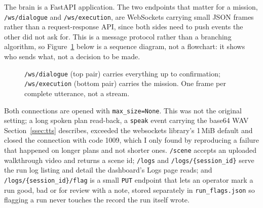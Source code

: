 \label{sec:protocol}

The brain is a FastAPI application. The two endpoints that matter for a
mission, \texttt{/ws/dialogue} and \texttt{/ws/execution}, are WebSockets
carrying small JSON frames rather than a request-response API, since both
sides need to push events the other did not ask for. This is a message
protocol rather than a branching algorithm, so Figure~\ref{fig:protocol}
below is a sequence diagram, not a flowchart: it shows who sends what, not a
decision to be made.

\begin{figure}[htbp]
  \centering
  \caption{\texttt{/ws/dialogue} (top pair) carries everything up to confirmation; \texttt{/ws/execution} (bottom pair) carries the mission. One frame per complete utterance, not a stream.}
  \label{fig:protocol}
\end{figure}

Both connections are opened with \texttt{max\_size=None}. This was not the
original setting; a long spoken plan read-back, a \texttt{speak} event
carrying the base64 WAV Section~\ref{ssec:tts} describes, exceeded the
websockets library's 1\,MiB default and closed the connection with code
1009, which I only found by reproducing a failure that happened on longer
plans and not shorter ones. \texttt{/scene} accepts an uploaded walkthrough
video and returns a scene id; \texttt{/logs} and
\texttt{/logs/\{session\_id\}} serve the run log listing and detail the
dashboard's Logs page reads; and \texttt{/logs/\{session\_id\}/flag} is a
small \texttt{PUT} endpoint that lets an operator mark a run good, bad or
for review with a note, stored separately in \texttt{run\_flags.json} so
flagging a run never touches the record the run itself wrote.

